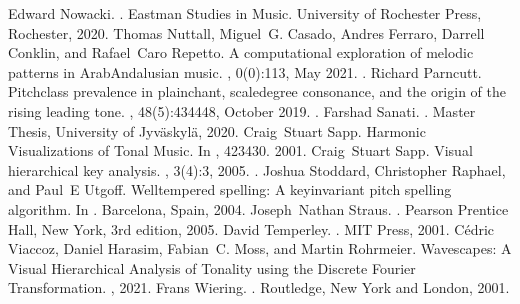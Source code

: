 \documentclass[letterpaper,10pt,english]{sphinxmanual}
\begin{document}
\begin{sphinxthebibliography}{10}
Edward Nowacki. . Eastman Studies in Music. University of Rochester Press, Rochester, 2020.
Thomas Nuttall, Miguel G. Casado, Andres Ferraro, Darrell Conklin, and Rafael Caro Repetto. A computational exploration of melodic patterns in Arab\sphinxhyphen{}Andalusian music. , 0(0):1\textendash{}13, May 2021. .
Richard Parncutt. Pitch\sphinxhyphen{}class prevalence in plainchant, scale\sphinxhyphen{}degree consonance, and the origin of the rising leading tone. , 48(5):434\textendash{}448, October 2019. .
Farshad Sanati. . Master Thesis, University of Jyväskylä, 2020.
Craig Stuart Sapp. Harmonic Visualizations of Tonal Music. In , 423\textendash{}430. 2001.
Craig Stuart Sapp. Visual hierarchical key analysis. , 3(4):3, 2005. .
Joshua Stoddard, Christopher Raphael, and Paul E Utgoff. Well\sphinxhyphen{}tempered spelling: A key\sphinxhyphen{}invariant pitch spelling algorithm. In . Barcelona, Spain, 2004.
Joseph Nathan Straus. . Pearson Prentice Hall, New York, 3rd edition, 2005.
David Temperley. . MIT Press, 2001.
Cédric Viaccoz, Daniel Harasim, Fabian C. Moss, and Martin Rohrmeier. Wavescapes: A Visual Hierarchical Analysis of Tonality using the Discrete Fourier Transformation. , 2021.
Frans Wiering. . Routledge, New York and London, 2001.
\end{sphinxthebibliography}


\renewcommand{\indexname}{Python Module Index}
\begin{sphinxtheindex}
\let\bigletter\sphinxstyleindexlettergroup
\bigletter{g}
\item\relax{}
\end{sphinxtheindex}

\renewcommand{\indexname}{Index}
\printindex
\end{document}
